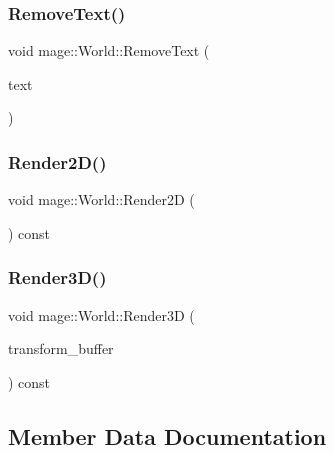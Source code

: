 \hypertarget{classmage_1_1_world_a5ae17dc1e2f8cc668a1a519430d409af}{}\label{classmage_1_1_world_a5ae17dc1e2f8cc668a1a519430d409af} 
\subsubsection{\texorpdfstring{Remove\+Text()}{RemoveText()}}
{\footnotesize\ttfamily void mage\+::\+World\+::\+Remove\+Text (\begin{DoxyParamCaption}\item[{\hyperlink{namespacemage_a1e01ae66713838a7a67d30e44c67703e}{Shared\+Ptr}$<$ \hyperlink{classmage_1_1_sprite_text}{Sprite\+Text} $>$}]{text }\end{DoxyParamCaption})}

\hypertarget{classmage_1_1_world_a49e7adf01a415aefc911d69c6fcee665}{}\label{classmage_1_1_world_a49e7adf01a415aefc911d69c6fcee665} 
\subsubsection{\texorpdfstring{Render2\+D()}{Render2D()}}
{\footnotesize\ttfamily void mage\+::\+World\+::\+Render2D (\begin{DoxyParamCaption}{ }\end{DoxyParamCaption}) const}

\hypertarget{classmage_1_1_world_a6d5a6fe97bf24c174d9c8f544be34d13}{}\label{classmage_1_1_world_a6d5a6fe97bf24c174d9c8f544be34d13} 
\subsubsection{\texorpdfstring{Render3\+D()}{Render3D()}}
{\footnotesize\ttfamily void mage\+::\+World\+::\+Render3D (\begin{DoxyParamCaption}\item[{const \hyperlink{structmage_1_1_transform_buffer}{Transform\+Buffer} \&}]{transform\+\_\+buffer }\end{DoxyParamCaption}) const}



\subsection{Member Data Documentation}
\hypertarget{classmage_1_1_world_a8c0f2183e71d368824bab701713c5792}{}\label{classmage_1_1_world_a8c0f2183e71d368824bab701713c5792} 
